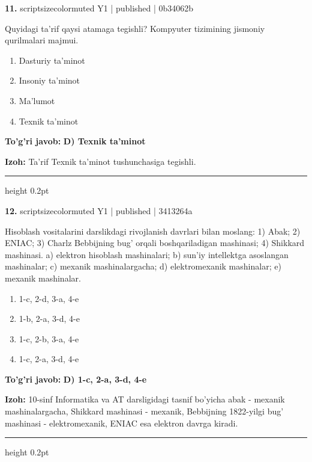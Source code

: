\documentclass[10pt,a4paper]{article}
\begin{document}
{\bfseries\sffamily\color{ink} 11.} {scriptsizecolor{muted} Y1 | published | 0b34062b}
\par
Quyidagi ta'rif qaysi atamaga tegishli? Kompyuter tizimining jismoniy qurilmalari majmui.
\begin{enumerate}[label=\Alph*),leftmargin=9mm]
\item Dasturiy ta'minot
\item Insoniy ta'minot
\item Ma'lumot
\item Texnik ta'minot
\end{enumerate}
\begin{tcolorbox}[enhanced,breakable,colback=teal!4,colframe=teal!60!black,boxrule=0.45pt,arc=1.2mm,left=2.7mm,right=2.7mm,top=1.8mm,bottom=1.8mm,before skip=2mm,after skip=2mm]
{\bfseries\sffamily\color{teal}To'g'ri javob:} \textbf{D) Texnik ta'minot}
\par\smallskip
{\bfseries Izoh:} Ta'rif Texnik ta'minot tushunchasiga tegishli.
\end{tcolorbox}
\vspace{2mm}\hrule height 0.2pt\vspace{3mm}

{\bfseries\sffamily\color{ink} 12.} {scriptsizecolor{muted} Y1 | published | 3413264a}
\par
Hisoblash vositalarini darslikdagi rivojlanish davrlari bilan moslang: 1) Abak; 2) ENIAC; 3) Charlz Bebbijning bug' orqali boshqariladigan mashinasi; 4) Shikkard mashinasi. a) elektron hisoblash mashinalari; b) sun'iy intellektga asoslangan mashinalar; c) mexanik mashinalargacha; d) elektromexanik mashinalar; e) mexanik mashinalar.
\begin{enumerate}[label=\Alph*),leftmargin=9mm]
\item 1-c, 2-d, 3-a, 4-e
\item 1-b, 2-a, 3-d, 4-e
\item 1-c, 2-b, 3-a, 4-e
\item 1-c, 2-a, 3-d, 4-e
\end{enumerate}
\begin{tcolorbox}[enhanced,breakable,colback=teal!4,colframe=teal!60!black,boxrule=0.45pt,arc=1.2mm,left=2.7mm,right=2.7mm,top=1.8mm,bottom=1.8mm,before skip=2mm,after skip=2mm]
{\bfseries\sffamily\color{teal}To'g'ri javob:} \textbf{D) 1-c, 2-a, 3-d, 4-e}
\par\smallskip
{\bfseries Izoh:} 10-sinf Informatika va AT darsligidagi tasnif bo'yicha abak - mexanik mashinalargacha, Shikkard mashinasi - mexanik, Bebbijning 1822-yilgi bug' mashinasi - elektromexanik, ENIAC esa elektron davrga kiradi.
\end{tcolorbox}
\vspace{2mm}\hrule height 0.2pt\vspace{3mm}
\end{document}
